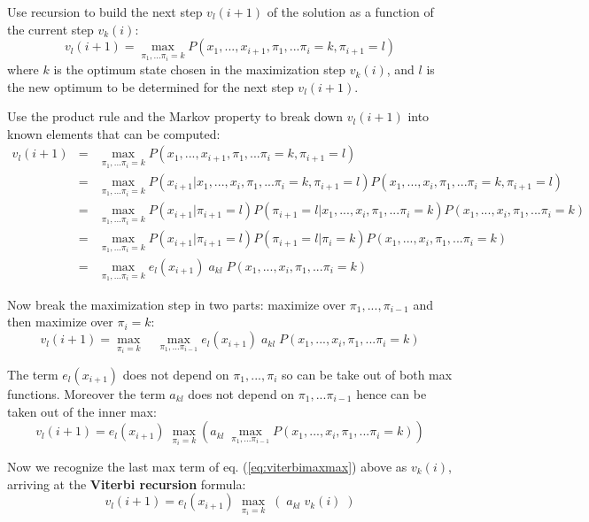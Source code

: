 Use recursion to build the next step $v_l(i+1)$ of the solution as a function of the current step $v_k(i)$:
\begin{equation}
v_l(i+1) = \max_{\pi_1,...\pi_{i}=k} P(x_1,...,x_{i+1}, \pi_1,...\pi_{i}=k, \pi_{i+1}=l)
\end{equation}
where $k$ is the optimum state chosen in the maximization step $v_k(i)$, and $l$ is the new optimum to be determined for the next step $v_l(i+1)$.

Use the product rule and the Markov property to break down $v_l(i+1)$ into known elements that can be computed:
\begin{eqnarray}
v_l(i+1)
& = &
\max_{\pi_1,...\pi_{i}=k}
P(x_1,...,x_{i+1}, \pi_1,...\pi_{i}=k, \pi_{i+1}=l)
\nonumber \\
& = &
\max_{\pi_1,...\pi_{i}=k}
P(x_{i+1} | x_1, ..., x_i, \pi_1,...\pi_{i}=k, \pi_{i+1}=l)
P(x_1, ..., x_i, \pi_1,...\pi_{i}=k, \pi_{i+1}=l)
\nonumber \\
& = &
\max_{\pi_1,...\pi_{i}=k}
P(x_{i+1} | \pi_{i+1}=l)
P(\pi_{i+1}=l | x_1, ..., x_i, \pi_1,...\pi_{i}=k) 
P(x_1, ..., x_i, \pi_1,...\pi_{i}=k)
\nonumber \\
& = &
\max_{\pi_1,...\pi_{i}=k}
P(x_{i+1} | \pi_{i+1}=l)
P(\pi_{i+1}=l | \pi_{i}=k)
P(x_1, ..., x_i, \pi_1,...\pi_{i}=k)
\nonumber \\
& = &
\max_{\pi_1,...\pi_{i}=k}
e_l(x_{i+1}) \;
a_{kl} \;
P(x_1, ..., x_i, \pi_1,...\pi_{i}=k)
\end{eqnarray}

Now break the maximization step in two parts: maximize over $\pi_1,...,\pi_{i-1}$ and then maximize over $\pi_i=k$:
\begin{equation}
v_l(i+1) =
\max_{\pi_{i}=k} \quad
\max_{\pi_1,...\pi_{i-1}}
e_l(x_{i+1}) \;
a_{kl} \;
P(x_1, ..., x_i, \pi_1,...\pi_{i}=k)
\end{equation}

The term $e_l(x_{i+1})$ does not depend on $\pi_1,...,\pi_i$ so can be take out of both max functions. Moreover the term $a_{kl}$ does not depend on $\pi_1,...\pi_{i-1}$ hence can be taken out of the inner max:
\begin{equation}
v_l(i+1) =
e_l(x_{i+1}) \;
\max_{\pi_{i}=k} \left(
a_{kl} \;
\max_{\pi_1,...\pi_{i-1}}
P(x_1, ..., x_i, \pi_1,...\pi_{i}=k)
\right)
\label{eq:viterbimaxmax}
\end{equation}

Now we recognize the last max term of eq. (\ref{eq:viterbimaxmax}) above as $v_k(i)$, arriving at the {\bf Viterbi recursion} formula:
\begin{equation}
\boxed{v_l(i+1) = e_l(x_{i+1}) \; \max_{\pi_{i}=k} \; ( \; a_{kl} \; v_k(i) \; )}
\label{eq:viterbi}
\end{equation}


